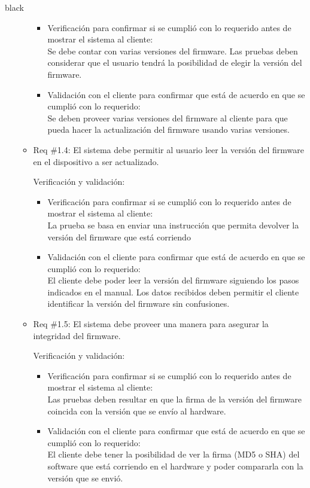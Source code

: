 \documentclass[11pt]{charter}
\begin{document}
\begin{consigna}{black}
\begin{itemize}
\begin{itemize}
	\begin{itemize}
		\item Verificación para confirmar si se cumplió con lo requerido antes de mostrar el sistema al cliente:\\
	    Se debe contar con varias versiones del firmware. Las pruebas deben considerar que el usuario tendrá la posibilidad de elegir la versión del firmware.
		\item Validación con el cliente para confirmar que está de acuerdo en que se cumplió con lo requerido:\\
		Se deben proveer varias versiones del firmware al cliente para que pueda hacer la actualización del firmware usando varias versiones.
	\end{itemize}

	\item Req \#1.4: El sistema debe permitir al usuario leer la versión del firmware en el dispositivo a ser actualizado.
	
	Verificación y validación:
	
	\begin{itemize}
		\item Verificación para confirmar si se cumplió con lo requerido antes de mostrar el sistema al cliente:\\
		La prueba se basa en enviar una instrucción que permita devolver la versión del firmware que está corriendo
		\item Validación con el cliente para confirmar que está de acuerdo en que se cumplió con lo requerido:\\
		El cliente debe poder leer la versión del firmware siguiendo los pasos indicados en el manual. Los datos recibidos deben permitir el cliente identificar la versión del firmware sin confusiones.
	\end{itemize}

	\item Req \#1.5: El sistema debe proveer una manera para asegurar la integridad del firmware.
	
	Verificación y validación:
	
	\begin{itemize}
		\item Verificación para confirmar si se cumplió con lo requerido antes de mostrar el sistema al cliente:\\
		Las pruebas deben resultar en que la firma de la versión del firmware coincida con la versión que se envío al hardware.
		\item Validación con el cliente para confirmar que está de acuerdo en que se cumplió con lo requerido:\\
		El cliente debe tener la posibilidad de ver la firma (MD5 o SHA) del software que está corriendo en el hardware y poder compararla con la versión que se envió.
	\end{itemize}


\end{itemize}
\end{itemize}
\end{consigna}
\end{document}
